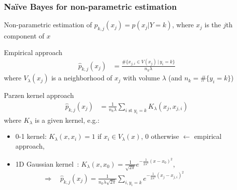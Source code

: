 \documentclass[compress, smaller, serif, 9pt]{beamer}
\begin{document}
\begin{frame}
 \frametitle{Naïve Bayes for  non-parametric estimation}

 \alert{Non-parametric} estimation of $p_{k,j}(x_j)= p(x_j|Y=k)$, where $x_j$ is the $j$th component of $x$
\begin{block}{Empirical approach}
\vspace{-8mm}
\begin{align*}
   \hat{p}_{k,j}(x_j) &= \frac{ \#\{x_{j,i} \in V(x_j) \, | \, y_i=k \} }{n_k \lambda}
\end{align*}
where $V_{\lambda}(x_j)$ is a neighborhood  of $x_j$ with volume $\lambda$ (and $n_k= \#\{ y_i=k \}$)
\end{block}
\bigskip

\begin{block}{Parzen kernel approach}
\vspace{-7mm}
\begin{align*}
   \hat{p}_{k,j}(x_j) &= \frac{1}{n_k \lambda} \sum_{i \textrm{ st } y_i=k} K_{\lambda}(x_j,x_{j,i})
\end{align*}
where $K_{\lambda}$ is a given kernel, e.g.:
\begin{itemize}
   \item 0-1 kernel: $K_{\lambda}(x,x_i)= 1$ if $x_i \in V_{\lambda}(x)$, $0$ otherwise $\leftarrow$ empirical approach,
   \item 1D Gaussian kernel~: $K_{\lambda}(x,x_0) = \frac{1}{\sqrt{2\pi}} e^{- \frac{1}{2\lambda^2}(x - x_0)^2}$, \\
   $\qquad \qquad \Rightarrow \quad  \hat{p}_{k,j}(x_j) = \frac{1}{n_k \lambda \sqrt{2 \pi} } \sum_{i, y_i=k}
   e^{- \frac{1}{2\lambda^2}(x_j - x_{j,i})^2}$
\end{itemize}
\end{block}
\end{frame}
\end{document}
